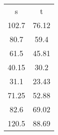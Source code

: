 \begin{table}
\begin{tabular}{cc}
s & t \\
102.7 & 76.12 \\
80.7 & 59.4 \\
61.5 & 45.81 \\
40.15 & 30.2 \\
31.1 & 23.43 \\
71.25 & 52.88 \\
82.6 & 69.02 \\
120.5 & 88.69 \\
\end{tabular}
\end{table}
